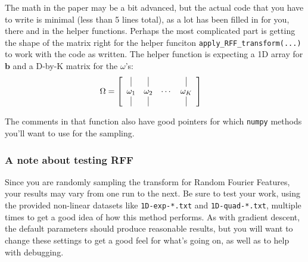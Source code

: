 \documentclass{article} %
\begin{document}
The math in the paper may be a bit advanced, but the actual code that you have to write is minimal (less than 5 lines total), 
as a lot has been filled in for you, there and in the helper functions. Perhaps the most complicated part is getting the 
shape of the matrix right for the helper funciton \texttt{apply\_RFF\_transform(...)} to work with the code as written. The 
helper function is expecting a 1D array for 
\(\mathbf{b}\) and a D-by-K matrix for the \(\omega\)'s:
\begin{align*}
	\Omega &= \left[\begin{array}{cccc}\vrule&\vrule& &\vrule\\\omega_1&\omega_2&\cdots&\omega_K\\\vrule&\vrule& &\vrule\end{array}\right]
\end{align*}

The comments in that function also have good pointers for which \texttt{numpy} methods you'll want to use for the sampling.

\subsubsection*{A note about testing RFF}
Since you are randomly sampling the transform for Random Fourier Features, your results may vary from one run to the next. Be 
sure to test your work, using the provided non-linear datasets like \texttt{1D-exp-*.txt} and \texttt{1D-quad-*.txt}, 
multiple times to get a good idea of how this method performs. As with gradient descent, the default parameters should 
produce reasonable results, but you will want to change these settings to get a good feel for what's going on, as well as to 
help with debugging.
\end{document}
